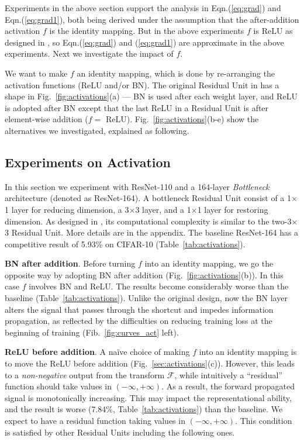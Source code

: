 \documentclass[runningheads]{llncs}
\begin{document}
Experiments in the above section support the analysis in Eqn.(\ref{eq:grad}) and Eqn.(\ref{eq:grad1}), both being derived under the assumption that the after-addition activation $f$ is the identity mapping. But in the above experiments $f$ is ReLU as designed in \cite{He2016}, so Eqn.(\ref{eq:grad}) and (\ref{eq:grad1}) are approximate in the above experiments. Next we investigate the impact of $f$.

We want to make $f$ an identity mapping, which is done by re-arranging the activation functions (ReLU and/or BN). The original Residual Unit in \cite{He2016} has a shape in Fig.~\ref{fig:activations}(a) --- BN is used after each weight layer, and ReLU is adopted after BN except that the last ReLU in a Residual Unit is after element-wise addition ($f=$  ReLU). Fig.~\ref{fig:activations}(b-e) show the alternatives we investigated, explained as following.


\subsection{Experiments on Activation}

In this section we experiment with ResNet-110 and a 164-layer \emph{Bottleneck} \cite{He2016} architecture (denoted as ResNet-164). A bottleneck Residual Unit consist of a 1$\times$1 layer for reducing dimension, a 3$\times$3 layer, and a 1$\times$1 layer for restoring dimension. As designed in \cite{He2016}, its computational complexity is similar to the two-3$\times$3 Residual Unit. More details are in the appendix.
The baseline ResNet-164 has a competitive result of 5.93\% on CIFAR-10 (Table~\ref{tab:activations}).

\textbf{BN after addition}. Before turning $f$ into an identity mapping, we go the opposite way by adopting BN after addition (Fig.~\ref{fig:activations}(b)). In this case $f$ involves BN and ReLU.
The results become considerably worse than the baseline (Table~\ref{tab:activations}). Unlike the original design, now the BN layer alters the signal that passes through the shortcut and impedes information propagation, as reflected by the difficulties on reducing training loss at the beginning of training (Fib.~\ref{fig:curves_act} left).

\textbf{ReLU before addition}. A na\"{i}ve choice of making $f$ into an identity mapping is to move the ReLU before addition (Fig.~\ref{sec:activations}(c)). However, this leads to a \emph{non-negative} output from the transform $\mathcal{F}$, while intuitively a ``residual'' function should take values in $(-\infty, +\infty)$. As a result, the forward propagated signal is monotonically increasing. This may impact the representational ability, and the result is worse (7.84\%, Table~\ref{tab:activations}) than the baseline.
We expect to have a residual function taking values in $(-\infty, +\infty)$. This condition is satisfied by other Residual Units including the following ones.
\end{document}
